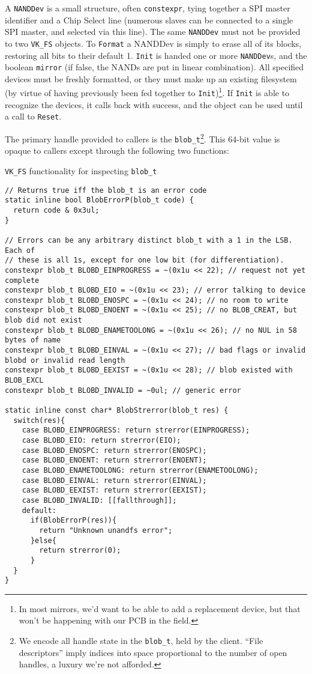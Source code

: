 \documentclass[letterpaper,10pt]{article}
\begin{document}
A {\texttt{NANDDev}} is a small structure, often {\texttt{constexpr}}, tying
together a SPI master identifier and a Chip Select line (numerous slaves can be
connected to a single SPI master, and selected via this line). The same {\texttt{NANDDev}}
must not be provided to two {\texttt{VK\_FS}} objects. To {\texttt{Format}} a
NANDDev is simply to erase all of its blocks, restoring all bits to their default
1. {\texttt{Init}} is handed one or more {\texttt{NANDDev}}s, and the boolean
{\texttt{mirror}} (if false, the NANDs are put in linear combination). All
specified devices must be freshly formatted, or they must make up an existing
filesystem (by virtue of having previously been fed together to
{\texttt{Init}})\footnote{In most mirrors, we'd want to be able to add a
  replacement device, but that won't be happening with our PCB in the field.}.
If {\texttt{Init}} is able to recognize the devices, it calls back with
success, and the object can be used until a call to {\texttt{Reset}}.

The primary handle provided to callers is the {\texttt{blob\_t}}\footnote{We encode
all handle state in the \texttt{blob\_t}, held by the client. ``File descriptors''
imply indices into space proportional to the number of open handles, a luxury we're not afforded.}.
This 64-bit value is opaque to callers except through the following two
functions:

\begin{listing}[ht]
\caption{{\texttt{VK\_FS}} functionality for inspecting {\texttt{blob\_t}}}
\begin{verbatim}
// Returns true iff the blob_t is an error code
static inline bool BlobErrorP(blob_t code) {
  return code & 0x3ul;
}

// Errors can be any arbitrary distinct blob_t with a 1 in the LSB. Each of
// these is all 1s, except for one low bit (for differentiation).
constexpr blob_t BLOBD_EINPROGRESS = ~(0x1u << 22); // request not yet complete
constexpr blob_t BLOBD_EIO = ~(0x1u << 23); // error talking to device
constexpr blob_t BLOBD_ENOSPC = ~(0x1u << 24); // no room to write
constexpr blob_t BLOBD_ENOENT = ~(0x1u << 25); // no BLOB_CREAT, but blob did not exist
constexpr blob_t BLOBD_ENAMETOOLONG = ~(0x1u << 26); // no NUL in 58 bytes of name
constexpr blob_t BLOBD_EINVAL = ~(0x1u << 27); // bad flags or invalid blobd or invalid read length
constexpr blob_t BLOBD_EEXIST = ~(0x1u << 28); // blob existed with BLOB_EXCL
constexpr blob_t BLOBD_INVALID = ~0ul; // generic error

static inline const char* BlobStrerror(blob_t res) {
  switch(res){
    case BLOBD_EINPROGRESS: return strerror(EINPROGRESS);
    case BLOBD_EIO: return strerror(EIO);
    case BLOBD_ENOSPC: return strerror(ENOSPC);
    case BLOBD_ENOENT: return strerror(ENOENT);
    case BLOBD_ENAMETOOLONG: return strerror(ENAMETOOLONG);
    case BLOBD_EINVAL: return strerror(EINVAL);
    case BLOBD_EEXIST: return strerror(EEXIST);
    case BLOBD_INVALID: [[fallthrough]];
    default:
      if(BlobErrorP(res)){
        return "Unknown unandfs error";
      }else{
        return strerror(0);
      }
  }
}
\end{verbatim}
\end{listing}
\end{document}
